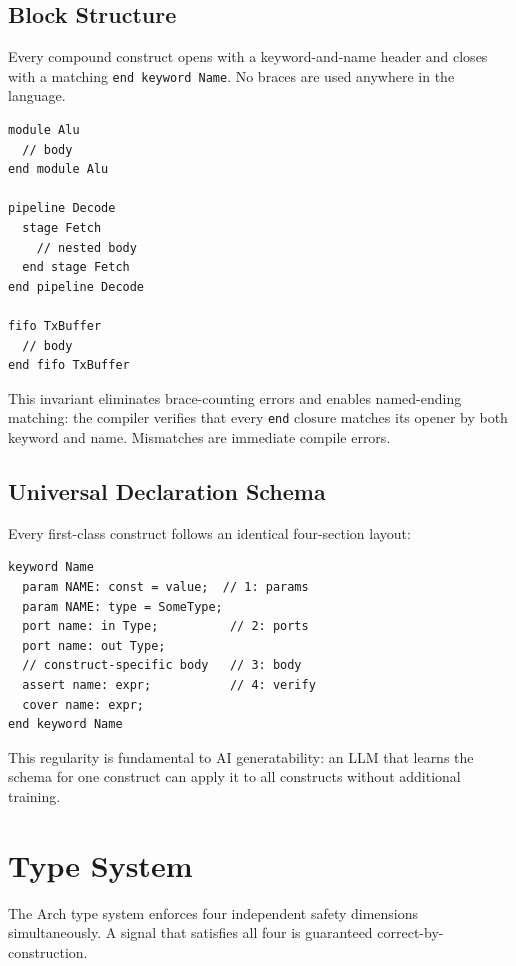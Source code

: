 \documentclass[11pt,twocolumn]{article}
\begin{document}
\subsection{Block Structure}

Every compound construct opens with a keyword-and-name header and closes with a matching \texttt{end keyword Name}. No braces are used anywhere in the language.

\begin{lstlisting}[language=Arch,caption={Universal block grammar},label={lst:block}]
module Alu
  // body
end module Alu

pipeline Decode
  stage Fetch
    // nested body
  end stage Fetch
end pipeline Decode

fifo TxBuffer
  // body
end fifo TxBuffer
\end{lstlisting}

This invariant eliminates brace-counting errors and enables named-ending matching: the compiler verifies that every \texttt{end} closure matches its opener by both keyword and name. Mismatches are immediate compile errors.

\subsection{Universal Declaration Schema}

Every first-class construct follows an identical four-section layout:

\begin{lstlisting}[language=Arch,caption={Universal schema},label={lst:schema}]
keyword Name
  param NAME: const = value;  // 1: params
  param NAME: type = SomeType;
  port name: in Type;          // 2: ports
  port name: out Type;
  // construct-specific body   // 3: body
  assert name: expr;           // 4: verify
  cover name: expr;
end keyword Name
\end{lstlisting}

This regularity is fundamental to AI generatability: an LLM that learns the schema for one construct can apply it to all constructs without additional training.

\section{Type System}\label{sec:types}

The Arch type system enforces four independent safety dimensions simultaneously. A signal that satisfies all four is guaranteed correct-by-construction.
\end{document}
